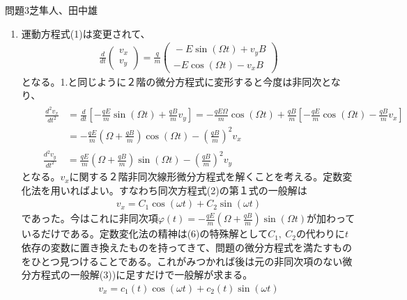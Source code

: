\documentclass[fleqn]{jbook}
\begin{document}
\begin{answer}{問題3}{芝隼人、田中雄}
\begin{enumerate}
\begin{eqnarray}
\begin{array}{c}{}
					   \sin (\omega t) \\ \cos (\omega t) -1 \end{array} \right)
					   \end{eqnarray}
					   となる。
					   \item
					   運動方程式(1)は変更されて、
					   \begin{eqnarray}
					       \frac{d}{dt}\left( \begin{array}{c}{}
					  v_x \\ v_y \end{array}\right) =\frac{q}{m}\left( \begin{array}{c}{}
					  -E\sin (\Omega t)+v_y B \\ -E\cos (\Omega t) -v_x B
					  \end{array}\right)
					  \end{eqnarray}
					  となる。1.と同じように２階の微分方程式に変形すると今度は非同次となり、
					  \begin{eqnarray}
					  && \begin{array}{rl}
					  \displaystyle\frac{d^2 v_x}{dt^2} &= \displaystyle\frac{d}{dt}\left[ -\frac{qE}{m}\sin (\Omega t)+\frac{qB}{m}v_y \right] = -\frac{qE\Omega}{m}\cos (\Omega t) +\frac{qB}{m}\left[ -\frac{qE}{m}\cos (\Omega t) -\frac{qB}{m}v_x \right] \\
					  &= -\displaystyle\frac{qE}{m}\left( \Omega +\frac{qB}{m}\right) \cos (\Omega t) -\left( \frac{qB}{m}\right)^2 v_x
					  \end{array}\\
					  &&\ \frac{d^2 v_y}{dt^2}\quad = \frac{qE}{m}\left( \Omega +\frac{qB}{m}\right) \sin (\Omega t) -\left( \frac{qB}{m}\right)^2 v_y
					  \end{eqnarray}
					  となる。$v_x$に関する２階非同次線形微分方程式を解くことを考える。定数変化法を用いればよい。すなわち同次方程式(2)の第１式の一般解は
					  \begin{eqnarray}
					  v_x = C_1 \cos (\omega t) +C_2 \sin (\omega t)
					  \end{eqnarray}
					  であった。今はこれに非同次項$\varphi (t) = -\frac{qE}{m}\left( \Omega +\frac{qB}{m}\right) \sin (\Omega t)$が加わっているだけである。定数変化法の精神は(6)の特殊解として$C_1,\ C_2$の代わりに$t$依存の変数に置き換えたものを持ってきて、問題の微分方程式を満たすものをひとつ見つけることである。これがみつかれば後は元の非同次項のない微分方程式の一般解(3))に足すだけで一般解が求まる。
					  \begin{eqnarray}
					  v_x = c_1 (t) \cos (\omega t) +c_2(t) \sin (\omega t)

\end{eqnarray}
\end{enumerate}
\end{answer}
\end{document}
